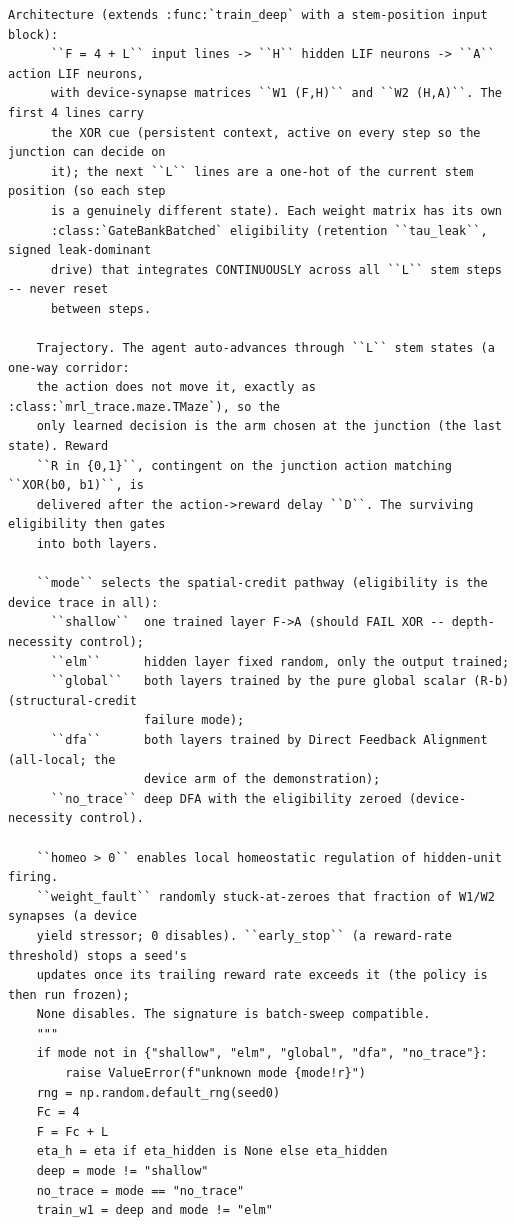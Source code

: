 \begin{lstlisting}[caption={mrl\_trace/deep\_sequential.py},label={lst:siox-src-deep_sequential}]
    Architecture (extends :func:`train_deep` with a stem-position input block):
      ``F = 4 + L`` input lines -> ``H`` hidden LIF neurons -> ``A`` action LIF neurons,
      with device-synapse matrices ``W1 (F,H)`` and ``W2 (H,A)``. The first 4 lines carry
      the XOR cue (persistent context, active on every step so the junction can decide on
      it); the next ``L`` lines are a one-hot of the current stem position (so each step
      is a genuinely different state). Each weight matrix has its own
      :class:`GateBankBatched` eligibility (retention ``tau_leak``, signed leak-dominant
      drive) that integrates CONTINUOUSLY across all ``L`` stem steps -- never reset
      between steps.

    Trajectory. The agent auto-advances through ``L`` stem states (a one-way corridor:
    the action does not move it, exactly as :class:`mrl_trace.maze.TMaze`), so the
    only learned decision is the arm chosen at the junction (the last state). Reward
    ``R in {0,1}``, contingent on the junction action matching ``XOR(b0, b1)``, is
    delivered after the action->reward delay ``D``. The surviving eligibility then gates
    into both layers.

    ``mode`` selects the spatial-credit pathway (eligibility is the device trace in all):
      ``shallow``  one trained layer F->A (should FAIL XOR -- depth-necessity control);
      ``elm``      hidden layer fixed random, only the output trained;
      ``global``   both layers trained by the pure global scalar (R-b) (structural-credit
                   failure mode);
      ``dfa``      both layers trained by Direct Feedback Alignment (all-local; the
                   device arm of the demonstration);
      ``no_trace`` deep DFA with the eligibility zeroed (device-necessity control).

    ``homeo > 0`` enables local homeostatic regulation of hidden-unit firing.
    ``weight_fault`` randomly stuck-at-zeroes that fraction of W1/W2 synapses (a device
    yield stressor; 0 disables). ``early_stop`` (a reward-rate threshold) stops a seed's
    updates once its trailing reward rate exceeds it (the policy is then run frozen);
    None disables. The signature is batch-sweep compatible.
    """
    if mode not in {"shallow", "elm", "global", "dfa", "no_trace"}:
        raise ValueError(f"unknown mode {mode!r}")
    rng = np.random.default_rng(seed0)
    Fc = 4
    F = Fc + L
    eta_h = eta if eta_hidden is None else eta_hidden
    deep = mode != "shallow"
    no_trace = mode == "no_trace"
    train_w1 = deep and mode != "elm"


\end{lstlisting}

